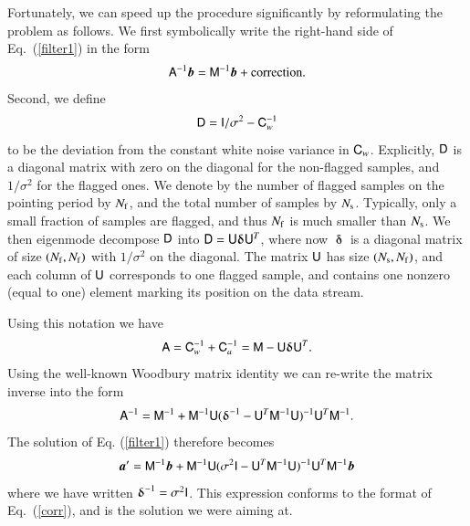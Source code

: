 \documentclass[twocolumn]{aa}
\newcommand{\ve}[1]{{\vec #1}}
\newcommand{\ma}[1]{\tens{#1}}
\begin{document}
Fortunately, we can speed up the procedure significantly by
reformulating the problem as follows.  We first symbolically write
the right-hand side of Eq.~(\ref{filter1}) in the form
%
\begin{equation}
 \ma A^{-1}\ve b = \ma M^{-1} {\ve b} + \mathrm{correction.}   \label{corr}
\end{equation}
%
Second, we define
%
\begin{equation}
\ma D=\ma I/\sigma^2-\ma C_w^{-1}
\end{equation}
% 
to be the deviation from the constant white noise variance in $\ma
C_{w}$. Explicitly, $\ma D$ is a diagonal matrix with zero on the
diagonal for the non-flagged samples, and $1/\sigma^2$ for the flagged
ones. We denote by the number of flagged samples on the pointing
period by $N_{\rm f}$, and the total number of samples by $N_{\rm s}$.
Typically, only a small fraction of samples are flagged, and thus
$N_{\rm f}$ is much smaller than $N_{\rm s}$.  We then eigenmode
decompose $\ma D$ into $\ma D=\ma U\boldsymbol\updelta\ma U^T$, where now
$\boldsymbol\updelta$ is a diagonal matrix of size $(N_{\rm f},N_{\rm f})$ with
$1/\sigma^2$ on the diagonal. The matrix $\ma U$ has size $(N_{\rm
  s},N_{\rm f})$, and each column of $\ma U$ corresponds to one
flagged sample, and contains one nonzero (equal to one) element
marking its position on the data stream.

Using this notation we have
%
\begin{equation}
\ma A = \ma C_w^{-1} +\ma C_a^{-1} =
\ma M -\ma U\boldsymbol\updelta\ma U^T .
\end{equation}
%
Using the well-known Woodbury matrix identity
we can re-write the matrix inverse into the form
%
\begin{equation} 
\ma A^{-1} = \ma M^{-1} +\ma M^{-1}\ma U 
(\boldsymbol\updelta^{-1}-\ma U^T\ma M^{-1}\ma U)^{-1} 
\ma U^T\ma M^{-1}.
\end{equation}
%
The solution of Eq. (\ref{filter1}) therefore becomes
%
\begin{equation}
\ve a' = \ma M^{-1}\ve b +
\ma M^{-1}\ma U 
(\sigma^2\ma I-\ma U^T\ma M^{-1}\ma U)^{-1} 
\ma U^T\ma M^{-1}\ve b
\label{filter2}
\end{equation}
%
where we have written $\boldsymbol\updelta^{-1}=\sigma^2\ma I$.  This expression
conforms to the format of Eq.~(\ref{corr}), and is the solution we
were aiming at.
\end{document}
